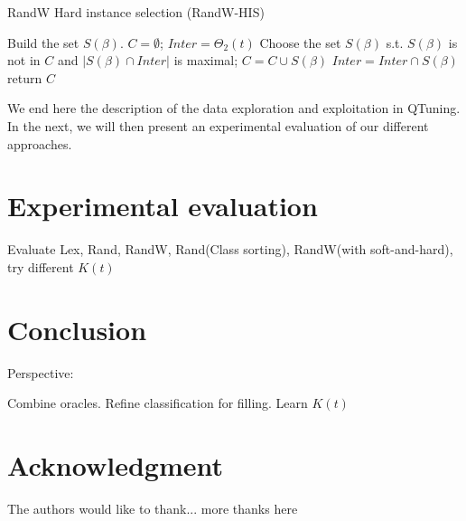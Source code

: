 \documentclass[10pt, conference, compsocconf]{IEEEtran}
\begin{document}
	\begin{algorithm}                    
	\caption{\scriptsize RandW Hard instance selection (RandW-HIS)} 	\label{alg4}  
	\begin{algorithmic}[1]
	\scriptsize
	\STATE Build the set $S(\beta)$.
	\ENDFOR
	\STATE $C = \emptyset$; $Inter = \Theta_2(t)$
		\STATE Choose the set $S(\beta)$ s.t. $S(\beta)$ is not in $C$ and $|S(\beta) \cap Inter|$ is maximal;
		\STATE $C  = C \cup S(\beta)$
                \STATE $Inter = Inter \cap S(\beta)$
	\ENDWHILE
	\STATE return $C$
	\end{algorithmic}
	\end{algorithm}
	\normalsize



We end here the description of the data exploration and exploitation in QTuning. In the next, we will then present an 
experimental evaluation of our different approaches.



\section{Experimental evaluation} \label{Proof-of-concept}

 Evaluate Lex, Rand, RandW, Rand(Class sorting), RandW(with soft-and-hard), try different $K(t)$

\section{Conclusion} \label{Conclusion}


Perspective: 

Combine oracles. Refine classification for filling. Learn $K(t)$



\section*{Acknowledgment}


The authors would like to thank...
more thanks here








\end{document}
